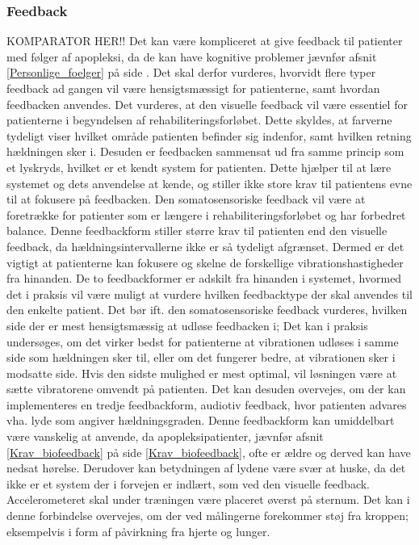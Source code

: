 \subsubsection{Feedback}
KOMPARATOR HER!!
Det kan være kompliceret at give feedback til patienter med følger af apopleksi, da de kan have kognitive problemer jævnfør afsnit \ref{Personlige_foelger} på side \pageref{Personlige_foelger}. Det skal derfor vurderes, hvorvidt flere typer feedback ad gangen vil være hensigtsmæssigt for patienterne, samt hvordan feedbacken anvendes. Det vurderes, at den visuelle feedback vil være essentiel for patienterne i begyndelsen af rehabiliteringsforløbet. Dette skyldes, at farverne tydeligt viser hvilket område patienten befinder sig indenfor, samt hvilken retning hældningen sker i. Desuden er feedbacken sammensat ud fra samme princip som et lyskryds, hvilket er et kendt system for patienten. Dette hjælper til at lære systemet og dets anvendelse at kende, og stiller ikke store krav til patientens evne til at fokusere på feedbacken. Den somatosensoriske feedback vil være at foretrække for patienter som er længere i rehabiliteringsforløbet og har forbedret balance. Denne feedbackform stiller større krav til patienten end den visuelle feedback, da hældningsintervallerne ikke er så tydeligt afgrænset. Dermed er det vigtigt at patienterne kan fokusere og skelne de forskellige vibrationshastigheder fra hinanden. De to feedbackformer er adskilt fra hinanden i systemet, hvormed det i praksis vil være muligt at vurdere hvilken feedbacktype der skal anvendes til den enkelte patient.
Det bør ift. den somatosensoriske feedback vurderes, hvilken side der er mest hensigtsmæssig at udløse feedbacken i; Det kan i praksis undersøges, om det virker bedst for patienterne at vibrationen udløses i samme side som hældningen sker til, eller om det fungerer bedre, at vibrationen sker i modsatte side. Hvis den sidste mulighed er mest optimal, vil løsningen være at sætte vibratorene omvendt på patienten. 
Det kan desuden overvejes, om der kan implementeres en tredje feedbackform, audiotiv feedback, hvor patienten advares vha. lyde som angiver hældningsgraden. Denne feedbackform kan umiddelbart være vanskelig at anvende, da apopleksipatienter, jævnfør afsnit \ref{Krav_biofeedback} på side \ref{Krav_biofeedback}, ofte er ældre og derved kan have nedsat hørelse. Derudover kan betydningen af lydene være svær at huske, da det ikke er et system der i forvejen er indlært, som ved den visuelle feedback.
Accelerometeret skal under træningen være placeret øverst på sternum. Det kan i denne forbindelse overvejes, om der ved målingerne forekommer støj fra kroppen; eksempelvis i form af påvirkning fra hjerte og lunger.


